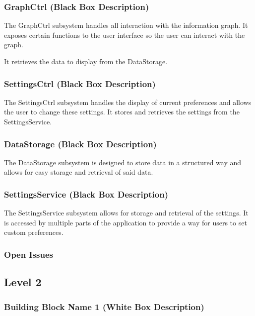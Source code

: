 \documentclass[]{article}
\begin{document}
\subsubsection{GraphCtrl (Black Box Description)}

The GraphCtrl subsystem handles all interaction with the information graph. It exposes certain functions to the user interface so the user can interact with the graph. 

It retrieves the data to display from the DataStorage.


\subsubsection{SettingsCtrl (Black Box Description)}

The SettingsCtrl subsystem handles the display of current preferences and allows the user to change these settings. It stores and retrieves the settings from the SettingsService.


\subsubsection{DataStorage (Black Box Description)}

The DataStorage subsystem is designed to store data in a structured way and allows for easy storage and retrieval of said data. 

\subsubsection{SettingsService (Black Box Description)}

The SettingsService subsystem allows for storage and retrieval of the settings. It is accessed by multiple parts of the application to provide a way for users to set custom preferences.

\subsubsection{Open Issues}

\subsection{Level 2}

\subsubsection{Building Block Name 1 (White Box Description)}
\end{document}
